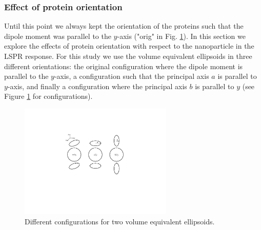 \subsubsection{Effect of protein orientation}

Until this point we always kept the orientation of the proteins such that the dipole moment was parallel to the $y$-axis ("orig" in Fig. \ref{fig:two_ve_conf_display}). In this 
section we explore the effects of protein orientation with respect to the nanoparticle in the LSPR response. For this study we use the 
volume equivalent ellipsoids in three different orientations: the original configuration where the dipole moment is parallel to 
the $y$-axis, a configuration such that the principal axis $a$ is parallel to $y$-axis, 
and finally a configuration where the principal axis $b$ is parallel to $y$ (see Figure \ref{fig:two_ve_conf_display} for configurations). 
 
 \begin{figure} %
    \centering
    \includegraphics[width=0.65\textwidth]{viz/two_ve_conf_display.pdf} 
    \caption{Different configurations for two volume equivalent ellipsoids.}
    \label{fig:two_ve_conf_display}
 \end{figure}
 
